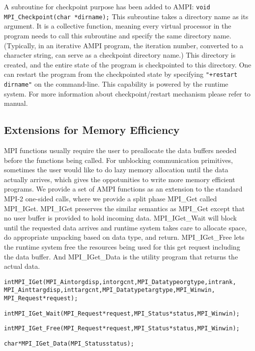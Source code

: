 \documentclass[10pt]{article}
\begin{document}
A subroutine for checkpoint purpose has been added to AMPI:
\texttt{void MPI\_Checkpoint(char *dirname);}
This subroutine takes a directory name as its argument. It is a collective 
function, meaning every virtual processor in the program needs to call this 
subroutine and specify the same directory name. (Typically, in an
iterative AMPI program, the iteration number, converted to a character string,
can serve as a checkpoint directory name.) This directory is created, and the
entire state of the program is checkpointed to this directory.  One can restart
the program from the checkpointed state by specifying \texttt{"+restart
dirname"} on the command-line. This capability is powered by the \charmpp{} 
runtime system. For more information about \charmpp{} checkpoint/restart
mechanism please refer to \charmpp{} manual. 

\subsection{Extensions for Memory Efficiency}

MPI functions usually require the user to preallocate the data buffers needed before the
functions being called. For unblocking communication primitives, sometimes the user would
like to do lazy memory allocation until the data actually arrives, which gives the
oppotunities to write more memory efficient programs.     
We provide a set of AMPI functions as an extension to the standard MPI-2 one-sided calls,
where we provide a split phase MPI\_Get called MPI\_IGet. MPI\_IGet preserves the similar
semantics as MPI\_Get except that no user buffer is provided to hold incoming data.
MPI\_IGet\_Wait will block until the requested data arrives and runtime system takes
care to allocate space, do appropriate unpacking based on data type, and return.
MPI\_IGet\_Free lets the runtime system free the resources being used for this get request
including the data buffer. And MPI\_IGet\_Data is the utility program that returns the
actual data.     
 

\begin{alltt}

int MPI_IGet(MPI_Aint orgdisp, int orgcnt, MPI_Datatype orgtype, int rank,
             MPI_Aint targdisp, int targcnt, MPI_Datatype targtype, MPI_Win win,
             MPI_Request *request);

int MPI_IGet_Wait(MPI_Request *request, MPI_Status *status, MPI_Win win);

int MPI_IGet_Free(MPI_Request *request, MPI_Status *status, MPI_Win win);

char* MPI_IGet_Data(MPI_Status status);

\end{alltt}
\end{document}
